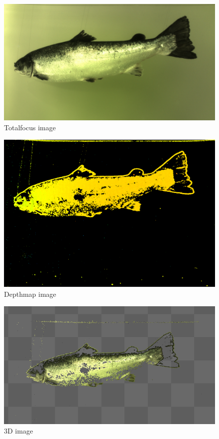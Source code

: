 \begin{figure}[h]
    \centering
    \includegraphics[width=.9\linewidth]{images/introduction/totalfocus}
    \caption{Totalfocus image}
    \label{fig:totalfocus}
\end{figure}

\begin{figure}[h]
    \centering
    \includegraphics[width=.9\linewidth]{images/introduction/depthmap}
    \caption{Depthmap image}
    \label{fig:depthmap}
\end{figure}

\begin{figure}[h]
    \centering
    \includegraphics[width=.9\linewidth]{images/introduction/depth3D}
    \caption{3D image}
    \label{fig:3d_image}
\end{figure}

